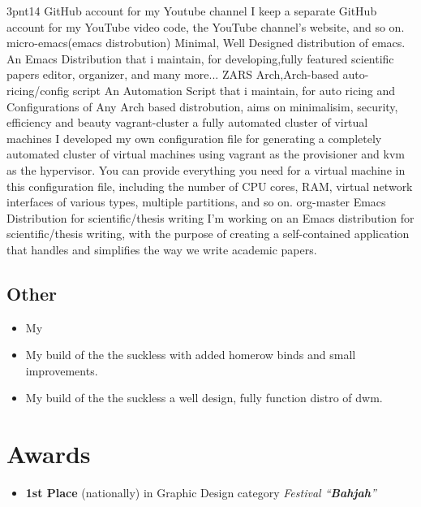 \documentclass{cv}
\begin{document}
    {3pnt14 \href{https://github.com/3pnt14}{\gh}}
    {GitHub account for my Youtube channel}
    {I keep a separate GitHub account for my YouTube video code, the YouTube channel's website, and so on.}
    {micro-emacs(emacs distrobution)\href{https://github.com/kebairia/micro-emacs}{\gh}}
    {Minimal, Well Designed distribution of emacs.} 
    {An Emacs Distribution that i maintain, for developing,fully featured scientific papers editor, organizer, and many more...}
    {ZARS \href{https://github.com/kebairia/zars}{\gh}}
	{Arch,Arch-based auto-ricing/config script}
    {An Automation Script that i maintain, for auto ricing and Configurations of Any Arch based distrobution, aims on minimalisim, security, efficiency and beauty}
    {vagrant-cluster \href{https://github.com/kebairia/vagrant-cluster}{\gh}}
    {a fully automated cluster of virtual machines}
    {I developed my own configuration file for generating a completely automated cluster of virtual machines using vagrant as the provisioner and kvm as the hypervisor. You can provide everything you need for a virtual machine in this configuration file, including the number of CPU cores, RAM, virtual network interfaces of various types, multiple partitions, and so on.}
    {org-master \href{https://github.com/kebairia/org-master}{\gh}}
    {Emacs Distribution for scientific/thesis writing}
    {I'm working on an Emacs distribution for scientific/thesis writing, with the purpose of creating a self-contained application that handles and simplifies the way we write academic papers.}

\subsection{Other}
\begin{itemize}
  \item My 
  \item My build of the the suckless  with added homerow binds and small improvements.
  \item My build of the the suckless  a well design, fully function distro of dwm.
\end{itemize}

\section{Awards}
\begin{itemize}
  \item \award  \textbf{1st Place} (nationally) in  Graphic Design category \emph{Festival ``\textbf{Bahjah}''}
\end{itemize}
\end{document}

